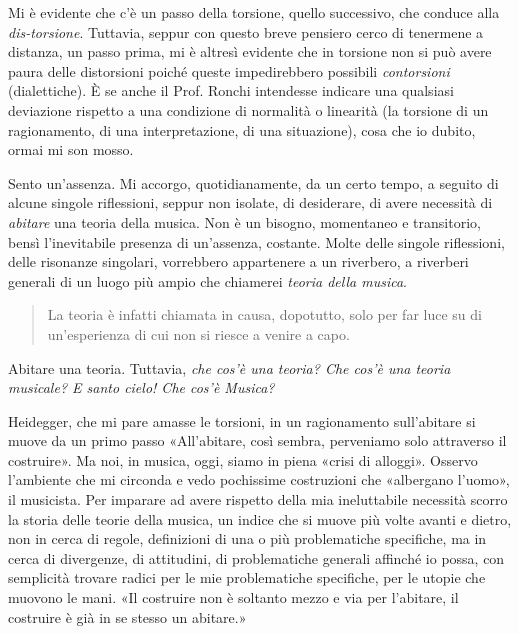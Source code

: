 \documentclass{gs}
\begin{document}
Mi è evidente che c'è un passo della torsione, quello successivo, che conduce alla \emph{dis-torsione}. %
Tuttavia, seppur con questo breve pensiero cerco di tenermene a distanza, un passo prima, mi è altresì evidente che in torsione non si può avere paura delle distorsioni poiché queste impedirebbero possibili \emph{contorsioni} (dialettiche). È se anche il Prof. Ronchi intendesse indicare una qualsiasi deviazione rispetto a una condizione di normalità o linearità (la torsione di un ragionamento, di una interpretazione, di una situazione), cosa che io dubito, ormai mi son mosso.

Sento un'assenza. Mi accorgo, quotidianamente, da un certo tempo, a seguito di alcune singole riflessioni, seppur non isolate, di desiderare, di avere necessità di \emph{abitare} una teoria della musica. Non è un bisogno, momentaneo e transitorio, bensì l'inevitabile presenza di un'assenza, costante. Molte delle singole riflessioni, delle risonanze singolari, vorrebbero appartenere a un riverbero, a riverberi generali di un luogo più ampio che chiamerei \emph{teoria della musica}. 

\begin{quote}
  La teoria è infatti chiamata in causa, dopotutto, solo per far luce su di un'esperienza di cui non si riesce a venire a capo. \cite{ronchi2001}
\end{quote}

Abitare una teoria. Tuttavia, \emph{che cos'è una teoria? Che cos'è una teoria musicale? E santo cielo! Che cos'è Musica?}

Heidegger, che mi pare amasse le torsioni, in un ragionamento sull'abitare \cite{heidegger1991} si muove da un primo passo «All'abitare, così sembra, perveniamo solo attraverso il costruire». Ma noi, in musica, oggi, siamo in piena «crisi di alloggi». Osservo l'ambiente che mi circonda e vedo pochissime costruzioni che «albergano l'uomo», il musicista. Per imparare ad avere rispetto della mia ineluttabile necessità scorro la storia delle teorie della musica, un indice che si muove più volte avanti e dietro, non in cerca di regole, definizioni di una o più problematiche specifiche, ma in cerca di divergenze, di attitudini, di problematiche generali affinché io possa, con semplicità trovare radici per le mie problematiche specifiche, per le utopie che muovono le mani. «Il costruire non è soltanto mezzo e via per l'abitare, il costruire è già in se stesso un abitare.» \cite{heidegger1991} %
\end{document}
